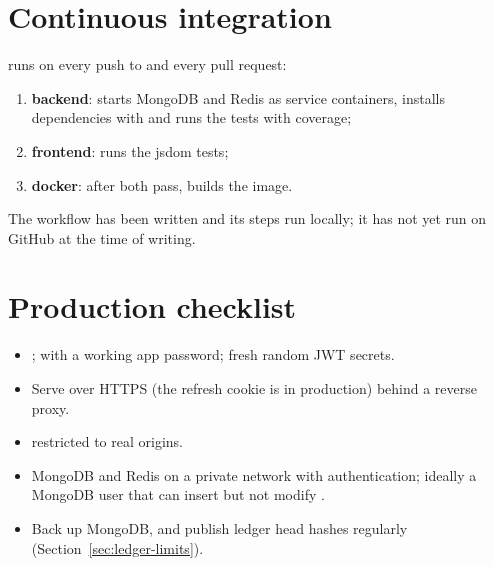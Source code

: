 \section{Continuous integration}

 runs on every push to  and every pull
request:

\begin{enumerate}
  \item \textbf{backend}: starts MongoDB and Redis as service containers,
    installs dependencies with  and runs the tests with coverage;
  \item \textbf{frontend}: runs the jsdom tests;
  \item \textbf{docker}: after both pass, builds the image.
\end{enumerate}

The workflow has been written and its steps run locally; it has not yet run on
GitHub at the time of writing.

\section{Production checklist}

\begin{itemize}
  \item {};  with a working
    app password; fresh random JWT secrets.
  \item Serve over HTTPS (the refresh cookie is  in production)
    behind a reverse proxy.
  \item {} restricted to real origins.
  \item MongoDB and Redis on a private network with authentication; ideally a
    MongoDB user that can insert but not modify .
  \item Back up MongoDB, and publish ledger head hashes regularly
    (Section~\ref{sec:ledger-limits}).
\end{itemize}
